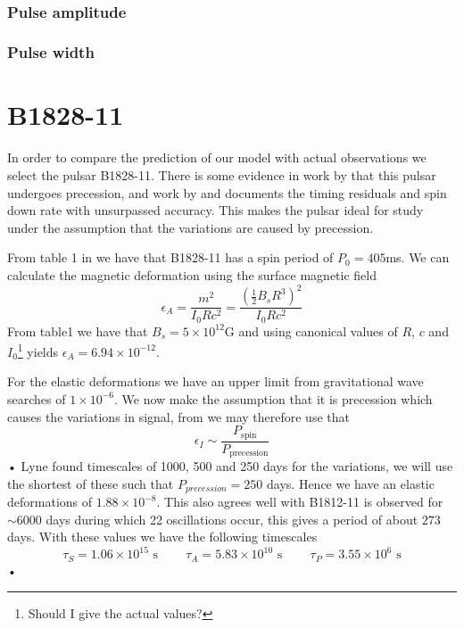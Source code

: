 \documentclass[/home/greg/Thesis/main/main.tex]{subfiles}
\begin{document}
\begin{figure}[ht]
\centering
	 \\
\caption{}
\label{fig: nu_dot no torque}
\end{figure}

\FloatBarrier

\subsubsection{Pulse amplitude}

\subsubsection{Pulse width}


\FloatBarrier
\section{B1828-11}
In order to compare the prediction of our model with actual observations we select the pulsar B1828-11. There is some evidence in work by \cite{Lyne2000} that this pulsar undergoes precession, and work by \cite{Hobbs2010} and \cite{Lyne2010} documents the timing residuals and spin down rate with unsurpassed accuracy. This makes the pulsar ideal for study under the assumption that the variations are caused by precession.

From table 1 in \citet{Lyne2000} we have that B1828-11 has a spin period of $P_{0}=405$ms. We can calculate the magnetic deformation using the surface magnetic field 
\begin{equation}
\epsilon_{A}=\frac{m^{2}}{I_{0}Rc^{2}}=\frac{(\frac{1}{2}B_{s}R^{3})^{2}}{I_{0}Rc^{2}}
\end{equation}
From table1 we have that $B_{s}=5\times10^{12}$G and using canonical values of $R$, $c$ and $I_{0}$\footnote{Should I give the actual values?} yields $\epsilon_{A}=6.94\times10^{-12}$.

For the elastic deformations we have an upper limit from gravitational wave searches of $1\times10^{-6}$. We now make the assumption that it is precession which causes the variations in signal, from \citet{Jones2001} we may therefore use that 
\begin{equation}
\epsilon_{I} \sim \frac{P_{\textrm{spin}}}{P_{\textrm{precession}}}
\end{equation}•
Lyne found timescales of 1000, 500 and 250 days for the variations, we will use the shortest of these such that $P_{precession}=250$ days. Hence we have an elastic deformations of $1.88 \times10^{-8}$. This also agrees well with \citet{Lyne2010} B1812-11 is observed for $\sim6000$ days during which 22 oscillations occur, this gives a period of about $273$ days. 
With these values we have the following timescales
\begin{equation*}
\tau_{S}=1.06\times10^{15} \textrm{ s} \;\;\;\; \;\;\;\; \tau_{A}=5.83\times10^{10} \textrm{ s} \;\;\;\; \;\;\;\; \tau_{P}=3.55\times10^{6} \textrm{ s}
\end{equation*}•
\end{document}
